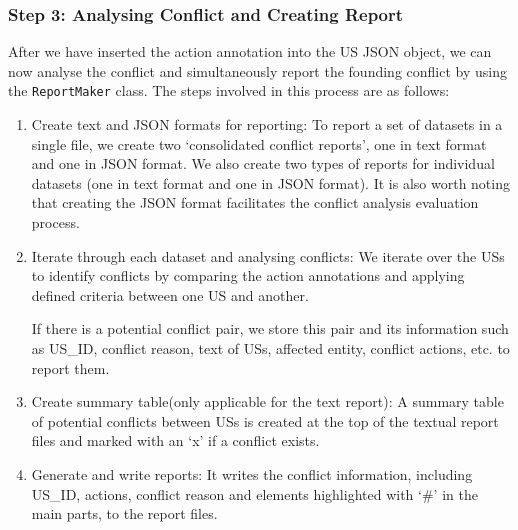 \subsubsection*{Step 3: Analysing Conflict and Creating Report}
After we have inserted the action annotation into the US JSON object, we can now analyse the conflict and simultaneously report the founding conflict by using the \texttt{ReportMaker} class. The steps involved in this process are as follows:
\begin{enumerate}
	\item Create text and JSON formats for reporting: To report a set of datasets in a single file, we create two ‘consolidated conflict reports’, one in text format and one in JSON format. We also create two types of reports for individual datasets (one in text format and one in JSON format). It is also worth noting that creating the JSON format facilitates the conflict analysis evaluation process.
	
	\item Iterate through each dataset and analysing conflicts: We iterate over the USs to identify conflicts by comparing the action annotations and applying defined criteria between one US and another.
	
	If there is a potential conflict pair, we store this pair and its information such as US\_ID, conflict reason, text of USs, affected entity, conflict actions, etc. to report them. 
	
	\item Create summary table(only applicable for the text report): A summary table of potential conflicts between USs is created at the top of the textual report files and marked with an ‘x’ if a conflict exists.
	
	\item Generate and write reports: It writes the conflict information, including US\_ID, actions, conflict reason and elements highlighted with ‘\#’ in the main parts, to the report files.
\end{enumerate}
